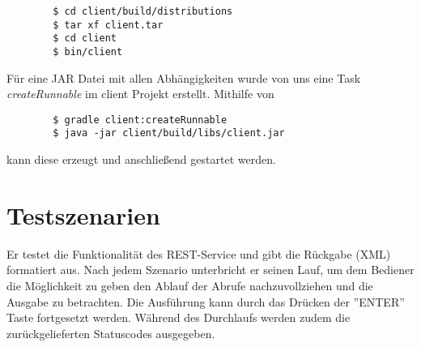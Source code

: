 \documentclass[150]{HSMW-Thesis}
\begin{document}
	\begin{verbatim}
		$ cd client/build/distributions
		$ tar xf client.tar
		$ cd client
		$ bin/client
	\end{verbatim}
	
	Für eine JAR Datei mit allen Abhängigkeiten wurde von uns eine Task \emph{createRunnable} im client Projekt erstellt. Mithilfe von
	\begin{verbatim}
		$ gradle client:createRunnable
		$ java -jar client/build/libs/client.jar
	\end{verbatim}
	
	kann diese erzeugt und anschließend gestartet werden.
	
\section{Testszenarien}
	
	Er testet die Funktionalität des REST-Service und gibt die Rückgabe (XML) formatiert aus. Nach jedem Szenario unterbricht er seinen Lauf, um dem Bediener die Möglichkeit zu geben den Ablauf der Abrufe nachzuvollziehen und die Ausgabe zu betrachten. Die Ausführung kann durch das Drücken der ''ENTER'' Taste fortgesetzt werden. Während des Durchlaufs werden zudem die zurückgelieferten Statuscodes ausgegeben.
	
\end{document}
